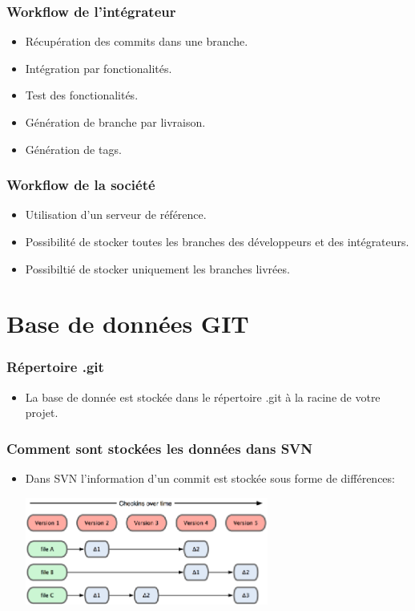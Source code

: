 \documentclass{beamer}
\begin{document}
    \begin{frame}
      \frametitle{Workflow de l'intégrateur}
      \begin{itemize}
        \item Récupération des commits dans une branche.
        \item Intégration par fonctionalités.
        \item Test des fonctionalités.
        \item Génération de branche par livraison.
        \item Génération de tags.
      \end{itemize}
    \end{frame}

    \begin{frame}
      \frametitle{Workflow de la société}
      \begin{itemize}
        \item Utilisation d'un serveur de référence.
        \item Possibilité de stocker toutes les branches des développeurs et des intégrateurs.
        \item Possibiltié de stocker uniquement les branches livrées.
      \end{itemize}
    \end{frame}
    \section{Base de données GIT}

    \begin{frame}
      \frametitle{Répertoire .git}
      \begin{itemize}
      \item La base de donnée est stockée dans le répertoire .git à la racine de votre projet.
      \end{itemize}
    \end{frame}

    \begin{frame}
      \frametitle{Comment sont stockées les données dans SVN}
      \begin{itemize}
        \item Dans SVN l'information d'un commit est stockée sous forme de différences:
          \begin{center}
            \includegraphics[width=8cm]{imgs/deltas.eps}
          \end{center}
      \end{itemize}
    \end{frame}
\end{document}
